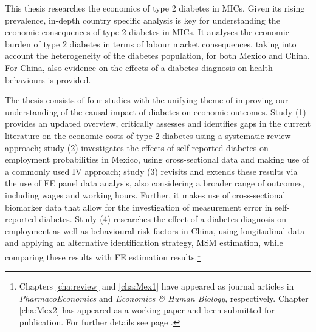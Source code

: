This thesis researches the economics of type 2 diabetes in \acfp{MIC}. Given its rising prevalence, in-depth country specific analysis is key for understanding the economic consequences of type 2 diabetes in \acp{MIC}. It analyses the economic burden of type 2 diabetes in terms of labour market consequences, taking into account the heterogeneity of the diabetes population, for both Mexico and China. For China, also evidence on the effects of a diabetes diagnosis on health behaviours is provided.

The thesis consists of four studies with the unifying theme of improving our understanding of the causal impact of diabetes on  economic outcomes. Study (1) provides an updated overview, critically assesses and identifies gaps in the current literature on the economic costs of type 2 diabetes using a systematic review approach; study (2) investigates the effects of self-reported diabetes on employment probabilities in Mexico, using cross-sectional data and making use of a commonly used \acf{IV} approach; study (3) revisits and extends these results via the use of \ac{FE} panel data analysis, also considering a broader range of outcomes, including wages and working hours. Further, it makes use of cross-sectional biomarker data that allow for the investigation of measurement error in self-reported diabetes. Study (4) researches the effect of a diabetes diagnosis on employment as well as behavioural risk factors in China, using longitudinal data and applying an alternative identification strategy, \acf{MSM} estimation, while comparing these results with \ac{FE} estimation results.\footnote{Chapters \ref{cha:review} and \ref{cha:Mex1} have appeared as journal articles in \textit{PharmacoEconomics} and \textit{Economics \& Human Biology}, respectively. Chapter \ref{cha:Mex2} has appeared as a working paper and been submitted for publication. For further details see page \pageref{publication_statement}.}

